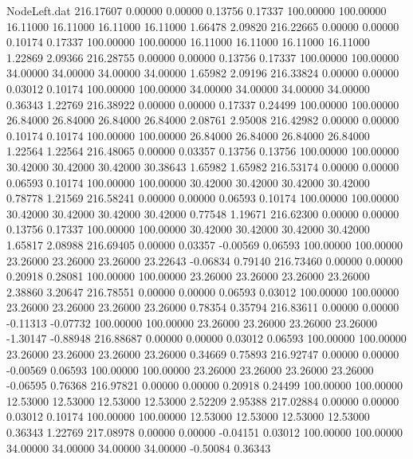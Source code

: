 \begin{filecontents}{NodeLeft.dat}
 216.17607    0.00000    0.00000     0.13756    0.17337  100.00000  100.00000   16.11000   16.11000   16.11000   16.11000    1.66478    2.09820
 216.22665    0.00000    0.00000     0.10174    0.17337  100.00000  100.00000   16.11000   16.11000   16.11000   16.11000    1.22869    2.09366
 216.28755    0.00000    0.00000     0.13756    0.17337  100.00000  100.00000   34.00000   34.00000   34.00000   34.00000    1.65982    2.09196
 216.33824    0.00000    0.00000     0.03012    0.10174  100.00000  100.00000   34.00000   34.00000   34.00000   34.00000    0.36343    1.22769
 216.38922    0.00000    0.00000     0.17337    0.24499  100.00000  100.00000   26.84000   26.84000   26.84000   26.84000    2.08761    2.95008
 216.42982    0.00000    0.00000     0.10174    0.10174  100.00000  100.00000   26.84000   26.84000   26.84000   26.84000    1.22564    1.22564
 216.48065    0.00000    0.03357     0.13756    0.13756  100.00000  100.00000   30.42000   30.42000   30.42000   30.38643    1.65982    1.65982
 216.53174    0.00000    0.00000     0.06593    0.10174  100.00000  100.00000   30.42000   30.42000   30.42000   30.42000    0.78778    1.21569
 216.58241    0.00000    0.00000     0.06593    0.10174  100.00000  100.00000   30.42000   30.42000   30.42000   30.42000    0.77548    1.19671
 216.62300    0.00000    0.00000     0.13756    0.17337  100.00000  100.00000   30.42000   30.42000   30.42000   30.42000    1.65817    2.08988
 216.69405    0.00000    0.03357    -0.00569    0.06593  100.00000  100.00000   23.26000   23.26000   23.26000   23.22643   -0.06834    0.79140
 216.73460    0.00000    0.00000     0.20918    0.28081  100.00000  100.00000   23.26000   23.26000   23.26000   23.26000    2.38860    3.20647
 216.78551    0.00000    0.00000     0.06593    0.03012  100.00000  100.00000   23.26000   23.26000   23.26000   23.26000    0.78354    0.35794
 216.83611    0.00000    0.00000    -0.11313   -0.07732  100.00000  100.00000   23.26000   23.26000   23.26000   23.26000   -1.30147   -0.88948
 216.88687    0.00000    0.00000     0.03012    0.06593  100.00000  100.00000   23.26000   23.26000   23.26000   23.26000    0.34669    0.75893
 216.92747    0.00000    0.00000    -0.00569    0.06593  100.00000  100.00000   23.26000   23.26000   23.26000   23.26000   -0.06595    0.76368
 216.97821    0.00000    0.00000     0.20918    0.24499  100.00000  100.00000   12.53000   12.53000   12.53000   12.53000    2.52209    2.95388
 217.02884    0.00000    0.00000     0.03012    0.10174  100.00000  100.00000   12.53000   12.53000   12.53000   12.53000    0.36343    1.22769
 217.08978    0.00000    0.00000    -0.04151    0.03012  100.00000  100.00000   34.00000   34.00000   34.00000   34.00000   -0.50084    0.36343

\end{filecontents}
